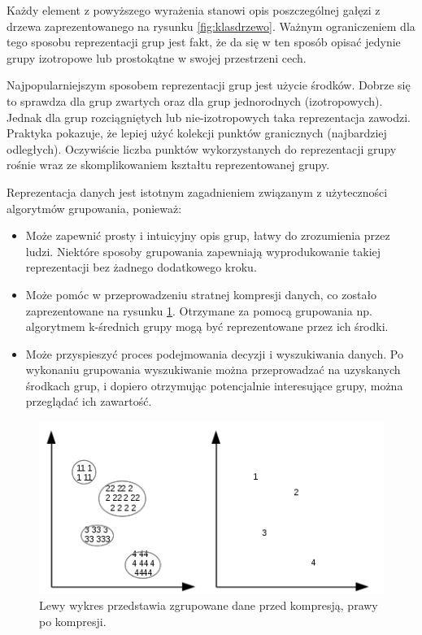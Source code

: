 \documentclass{article}
\begin{document}
Każdy element z powyższego wyrażenia stanowi opis poszczególnej gałęzi z drzewa zaprezentowanego na rysunku \ref{fig:klasdrzewo}. Ważnym ograniczeniem dla tego sposobu reprezentacji grup jest fakt, że da się w ten sposób opisać jedynie grupy izotropowe lub prostokątne w swojej przestrzeni cech.

Najpopularniejszym sposobem reprezentacji grup jest użycie środków. Dobrze się to sprawdza dla grup zwartych oraz dla grup jednorodnych (izotropowych). Jednak dla grup rozciągniętych lub nie-izotropowych taka reprezentacja zawodzi. Praktyka pokazuje, że lepiej użyć kolekcji punktów granicznych (najbardziej odległych). Oczywiście liczba punktów wykorzystanych do reprezentacji grupy rośnie wraz ze skomplikowaniem kształtu reprezentowanej grupy.

Reprezentacja danych jest istotnym zagadnieniem związanym z użyteczności algorytmów grupowania, ponieważ:

\begin{itemize}
	\item Może zapewnić prosty i intuicyjny opis grup, łatwy do zrozumienia przez ludzi. Niektóre sposoby grupowania zapewniają wyprodukowanie takiej reprezentacji bez żadnego dodatkowego kroku.
	\item Może pomóc w przeprowadzeniu stratnej kompresji danych, co zostało zaprezentowane na rysunku \ref{fig:kompresjagrup}. Otrzymane za pomocą grupowania np. algorytmem k-średnich grupy mogą być reprezentowane przez ich środki.
	\item {Może przyspieszyć proces podejmowania decyzji i wyszukiwania danych. Po wykonaniu grupowania wyszukiwanie można przeprowadzać na uzyskanych środkach grup, i dopiero otrzymując potencjalnie interesujące grupy, można przeglądać ich zawartość.}
\end{itemize}

\begin{figure}
	\centering
	\includegraphics[]{kompresjagrup.png}
	\caption{Lewy wykres przedstawia zgrupowane dane przed kompresją, prawy po kompresji.}
	\label{fig:kompresjagrup}
\end{figure}
\end{document}
